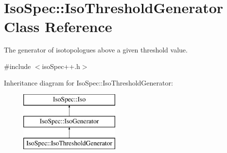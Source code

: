 \hypertarget{class_iso_spec_1_1_iso_threshold_generator}{}\section{Iso\+Spec\+:\+:Iso\+Threshold\+Generator Class Reference}
\label{class_iso_spec_1_1_iso_threshold_generator}


The generator of isotopologues above a given threshold value.  




{\ttfamily \#include $<$iso\+Spec++.\+h$>$}

Inheritance diagram for Iso\+Spec\+:\+:Iso\+Threshold\+Generator\+:\begin{figure}[H]
\begin{center}
\leavevmode
\includegraphics[height=3.000000cm]{class_iso_spec_1_1_iso_threshold_generator}
\end{center}
\end{figure}
